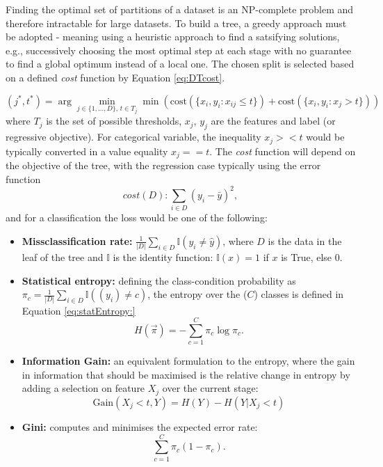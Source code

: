 Finding the optimal set of partitions of a dataset is an NP-complete problem and therefore intractable for large datasets. To build a tree, a greedy approach must be adopted - meaning using a heuristic approach to find a satsifying solutions, e.g., successively choosing the most optimal step at each stage with no guarantee to find a global optimum instead of a local one. The chosen split is selected based on a defined \textit{cost} function by Equation \ref{eq:DTcost}.

\begin{equation}\label{eq:DTcost}
    (j^*, t^*) = \arg\min_{j\in \{1, ..., D\},\, t \in T_j} \min \left(\text{cost} (\{x_i, y_i : x_{ij} \leq t\}) + \text{cost}(\{x_i, y_i : x_j > t\}) \right)
\end{equation}
where $T_j$ is the set of possible thresholds, $x_j$, $y_j$ are the features and label (or regressive objective). For categorical variable, the inequality $x_j >< t$ would be typically converted in a value equality $x_j == t$. The \textit{cost} function will depend on the objective of the tree, with the regression case typically using the error function \[cost(D) : \sum_{i\in D}(y_i - \bar{y})^2,\] and for a classification the loss would be one of the following:
\begin{itemize}
    \item \textbf{Missclassification rate:} $\frac{1}{|D|} \sum_{i \in D} \mathbb{I}(y_i \neq \hat{y})$, where $D$ is the data in the leaf of the tree and $\mathbb{I}$ is the identity function: $\mathbb{I}(x) = 1$ if $x$ is True, else $0$. 
    \item \textbf{Statistical entropy:} defining the class-condition probability as $\pi_c = \frac{1}{|D|} \sum_{i \in D} \mathbb{I}((y_i) \neq c)$, the entropy over the ($C$) classes is defined in Equation \ref{eq:statEntropy:}
    \begin{equation}\label{eq:statEntropy}
        H(\vec{\pi}) = - \sum_{c=1}^C \pi_c \log \pi_c.
    \end{equation}
    \item \textbf{Information Gain:} an equivalent formulation to the entropy, where the gain in information that should be maximised is the relative change in entropy by adding a selection on feature $X_j$ over the current stage: 
    \[ \text{Gain}(X_j < t, Y) = H(Y) - H(Y | X_j < t) \]
    \item \textbf{Gini:} computes and minimises the expected error rate: \[\sum_{c=1}^C \pi_c (1 - \pi_c).\]
\end{itemize}

